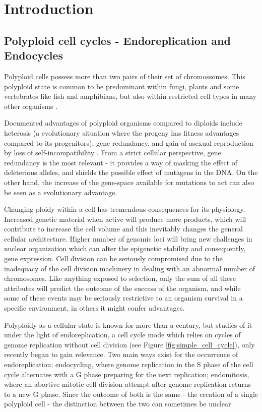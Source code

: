 \documentclass[11pt,twoside,a4paper]{report}
\begin{document}
\chapter{Introduction}

	\section{Polyploid cell cycles - Endoreplication and Endocycles}
		Polyploid cells possess more than two pairs of their set of chromossomes. This polyploid state is common to be predominant within fungi, plants and some vertebrates like fish and amphibians, but also within restricted cell types in many other organisms \cite{Fox2013}.
		
		Documented advantages of polyploid organisms compared to diploids include heterosis (a evolutionary situation where the progeny has fitness advantages compared to its progenitors), gene redundancy, and gain of asexual reproduction by loss of self-incompatibility \cite{Comai2005}. From a strict cellular perspective, gene redundancy is the most relevant - it provides a way of masking the effect of deleterious alleles, and shields the possible effect of mutagens in the DNA. On the other hand, the increase of the gene-space available for mutations to act can also be seen as a evolutionary advantage.
		
		Changing ploidy within a cell has tremendous consequences for its physiology. Increased genetic material when active will produce more products, which will contribute to increase the cell volume and this inevitably changes the general cellular architecture. Higher number of genomic loci will bring new challenges in nuclear organization which can alter the epigenetic stability and consequently, gene expression. Cell division can be seriously compromised due to the inadequacy of the cell division machinery in dealing with an abnormal number of chromosomes. Like anything exposed to selection, only the sum of all these attributes will predict the outcome of the success of the organism, and while some of these events may be seriously restrictive to an organism survival in a specific environment, in others it might confer advantages.
		
		Polyploidy as a cellular state is known for more than a century, but studies of it under the light of endoreplication, a cell cycle mode which relies on cycles of genome replication without cell division (see Figure \ref{fig:simple_cell_cycle}), only recently began to gain relevance. Two main ways exist for the occurrence of endoreplication: endocycling, where genome replication in the S phase of the cell cycle alternates with a G phase preparing for the next replication; endomitosis, where an abortive mitotic cell division attempt after genome replication returns to a new G phase. Since the outcome of both is the same - the creation of a single polyploid cell - the distinction between the two can sometimes be unclear.
		
\end{document}

